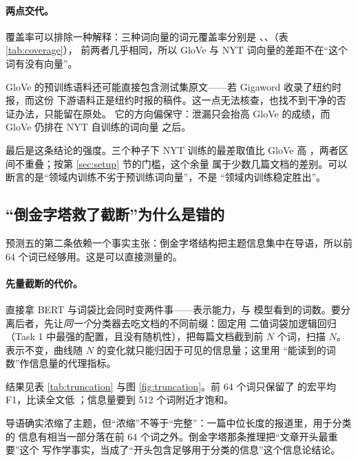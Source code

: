 \documentclass[11pt]{article}
\begin{document}
\paragraph{两点交代。} 覆盖率可以排除一种解释：三种词向量的词元覆盖率分别是
\resultGloveCov{}、\resultNytCov{}、\resultAgCov{}（表 \ref{tab:coverage}），
前两者几乎相同，所以 GloVe 与 NYT 词向量的差距不在``这个词有没有向量''。

GloVe 的预训练语料还可能直接包含测试集原文——若 Gigaword 收录了纽约时报，而这份
下游语料正是纽约时报的稿件。这一点无法核查，也找不到干净的否证办法，只能留在原处。
它的方向偏保守：泄漏只会抬高 GloVe 的成绩，而 GloVe 仍排在 NYT 自训练的词向量
之后。

最后是这条结论的强度。三个种子下 NYT 训练的最差取值比 GloVe 高
\resultNytOverGlove{}，两者区间不重叠；按第 \ref{sec:setup} 节的门槛，这个余量
属于少数几篇文档的差别。可以断言的是``领域内训练不劣于预训练词向量''，不是
``领域内训练稳定胜出''。

\subsection{``倒金字塔救了截断''为什么是错的}

预测五的第二条依赖一个事实主张：倒金字塔结构把主题信息集中在导语，所以前 64
个词已经够用。这是可以直接测量的。

\paragraph{先量截断的代价。} 直接拿 BERT 与词袋比会同时变两件事——表示能力，与
模型看到的词数。要分离后者，先让\emph{同一个}分类器去吃文档的不同前缀：固定用
二值词袋加逻辑回归（Task 1 中最强的配置，且没有随机性），把每篇文档截到前 $N$
个词，扫描 $N$。表示不变，曲线随 $N$ 的变化就只能归因于可见的信息量；这里用
``能读到的词数''作信息量的代理指标。

结果见表 \ref{tab:truncation} 与图 \ref{fig:truncation}。前 64 个词只保留了
\resultTruncShort{} 的宏平均 F1，比读全文低 \resultTruncShortLoss{}；信息量要到
512 个词附近才饱和。

导语确实浓缩了主题，但``浓缩''不等于``完整''：一篇中位长度的报道里，用于分类的
信息有相当一部分落在前 64 个词之外。倒金字塔那条推理把``文章开头最重要''这个
写作学事实，当成了``开头包含足够用于分类的信息''这个信息论结论。

\begin{table}[t]
  \centering
  \footnotesize
  \caption{前缀长度扫描。表示固定为二值词袋加逻辑回归，只有可见的词数变化。
  这就是``读一个前缀要付多少代价''的测量值。}
  \label{tab:truncation}
  
\end{table}
\end{document}
